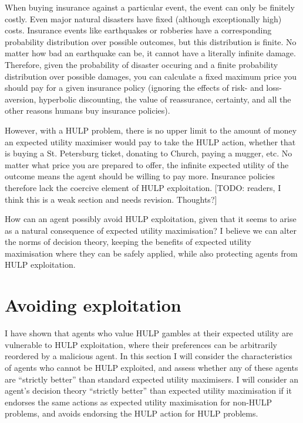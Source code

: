 \documentclass{article}
\begin{document}
When buying insurance against a particular event, the event can only be finitely costly. Even major natural disasters have fixed (although exceptionally high) costs. Insurance events like earthquakes or robberies have a corresponding probability distribution over possible outcomes, but this distribution is finite. No matter how bad an earthquake can be, it cannot have a literally infinite damage. Therefore, given the probability of disaster occuring and a finite probability distribution over possible damages, you can calculate a fixed maximum price you should pay for a given insurance policy (ignoring the effects of risk- and loss-aversion, hyperbolic discounting, the value of reassurance, certainty, and all the other reasons humans buy insurance policies). 

However, with a HULP problem, there is no upper limit to the amount of money an expected utility maximiser would pay to take the HULP action, whether that is buying a St. Petersburg ticket, donating to Church, paying a mugger, etc. No matter what price you are prepared to offer, the infinite expected utility of the outcome means the agent should be willing to pay more. Insurance policies therefore lack the coercive element of HULP exploitation. [TODO: readers, I think this is a weak section and needs revision. Thoughts?]

How can an agent possibly avoid HULP exploitation, given that it seems to arise as a natural consequence of expected utility maximisation? I believe we can alter the norms of decision theory, keeping the benefits of expected utility maximisation where they can be safely applied, while also protecting agents from HULP exploitation.

\newpage\section{Avoiding exploitation}

I have shown that agents who value HULP gambles at their expected utility are vulnerable to HULP exploitation, where their preferences can be arbitrarily reordered by a malicious agent. In this section I will consider the characteristics of agents who cannot be HULP exploited, and assess whether any of these agents are ``strictly better'' than standard expected utility maximisers. I will consider an agent's decision theory ``strictly better'' than expected utility maximisation if it endorses the same actions as expected utility maximisation for non-HULP problems, and avoids endorsing the HULP action for HULP problems.
\end{document}

